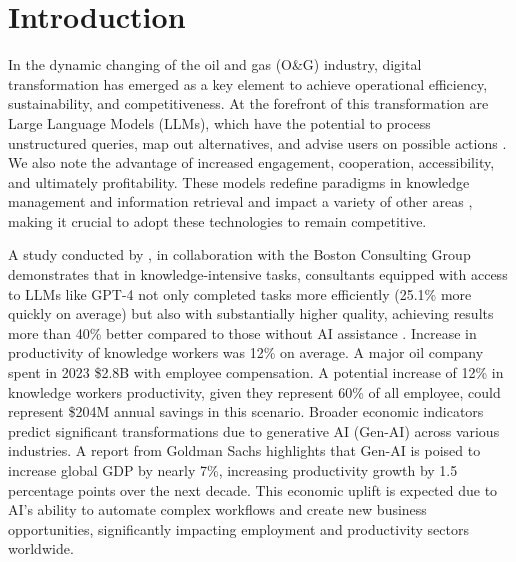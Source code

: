 
\chapter{Introduction}




    In the dynamic changing of the oil and gas (O\&G) industry, digital transformation has emerged as a key element to achieve operational efficiency, sustainability, and competitiveness. 
    At the forefront of this transformation are Large Language Models (LLMs), which have the potential to process unstructured queries, map out alternatives, and advise users on possible actions \cite{Kar2023}. 
    We also note the advantage of increased engagement, cooperation, accessibility, and ultimately profitability. 
    These models redefine paradigms in knowledge management and information retrieval and impact a variety of other areas \cite{Eckroth2023}, making it crucial to adopt these technologies to remain competitive.    
    
    A study conducted by \cite{Dellacqua2023}, in collaboration with the Boston Consulting Group demonstrates that in knowledge-intensive tasks, consultants equipped with access to LLMs like GPT-4 not only completed tasks more efficiently (25.1\% more quickly on average) but also with substantially higher quality, achieving results more than 40\% better compared to those without AI assistance \cite{Dellacqua2023}. Increase in productivity of knowledge workers was 12\% on average.    
    A major oil company spent in 2023 \$2.8B with employee compensation. A potential increase of 12\% in knowledge workers productivity, given they represent 60\% of all employee, could represent \$204M annual savings in this scenario.     
    Broader economic indicators predict significant transformations due to generative AI (Gen-AI) across various industries.
    A report from Goldman Sachs \cite{Hatzius2023} highlights that Gen-AI is poised to increase global GDP by nearly 7\%, increasing productivity growth by 1.5 percentage points over the next decade. 
    This economic uplift is expected due to AI's ability to automate complex workflows and create new business opportunities, significantly impacting employment and productivity sectors worldwide.
            
